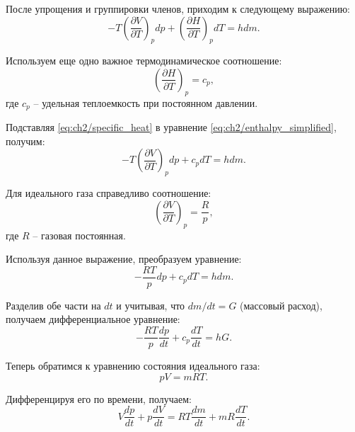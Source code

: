 После упрощения и группировки членов, приходим к следующему выражению:
\begin{equation}
\label{eq:ch2/enthalpy_simplified}
    -T \left(
    \frac{\partial V}{\partial T}
    \right)_p dp + \left(
    \frac{\partial H}{\partial T}
    \right)_p dT = hdm.
\end{equation}

Используем еще одно важное термодинамическое соотношение:
\begin{equation}
\label{eq:ch2/specific_heat}
    \left(
    \frac{\partial H}{\partial T}
    \right)_p = c_p,
\end{equation}
где $c_p$ -- удельная теплоемкость при постоянном давлении.

Подставляя \eqref{eq:ch2/specific_heat} в уравнение \eqref{eq:ch2/enthalpy_simplified}, получим:
\begin{equation}
\label{eq:ch2/enthalpy_final}
    -T \left(
    \frac{\partial V}{\partial T}
    \right)_p dp + c_p dT = hdm.
\end{equation}

Для идеального газа справедливо соотношение:
\begin{equation}
\label{eq:ch2/ideal_gas_relation}
    \left(\frac{\partial V}{\partial T}\right)_p = \frac{R}{p},
\end{equation}
где $R$ -- газовая постоянная.

Используя данное выражение, преобразуем уравнение:
\begin{equation}
\label{eq:ch2/pressure_temp_relation}
    -\frac{RT}{p} dp + c_p dT = h dm.
\end{equation}

Разделив обе части на $dt$ и учитывая, что $dm/dt = G$ (массовый расход), получаем дифференциальное уравнение:
\begin{equation}
\label{eq:ch2/differential_equation}
    -\frac{RT}{p} \frac{dp}{dt} + c_p \frac{dT}{dt} = hG.
\end{equation}

Теперь обратимся к уравнению состояния идеального газа:
\begin{equation}
\label{eq:ch2/ideal_gas_equation}
    pV = mRT.
\end{equation}

Дифференцируя его по времени, получаем:
\begin{equation}
\label{eq:ch2/ideal_gas_differential}
    V\frac{dp}{dt} + p\frac{dV}{dt} = RT\frac{dm}{dt} + mR\frac{dT}{dt}.
\end{equation}

